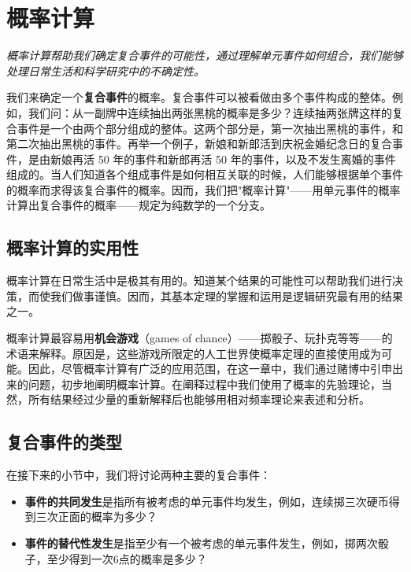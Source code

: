 \section{概率计算}

\begin{logicbox}[title=引言]
\textit{概率计算帮助我们确定复合事件的可能性，通过理解单元事件如何组合，我们能够处理日常生活和科学研究中的不确定性。}
\end{logicbox}

我们来确定一个\textbf{复合事件}的概率。复合事件可以被看做由多个事件构成的整体。例如，我们问：从一副牌中连续抽出两张黑桃的概率是多少？连续抽两张牌这样的复合事件是一个由两个部分组成的整体。这两个部分是，第一次抽出黑桃的事件，和第二次抽出黑桃的事件。再举一个例子，新娘和新郎活到庆祝金婚纪念日的复合事件，是由新娘再活 50 年的事件和新郎再活 50 年的事件，以及不发生离婚的事件组成的。当人们知道各个组成事件是如何相互关联的时候，人们能够根据单个事件的概率而求得该复合事件的概率。因而，我们把"概率计算"——用单元事件的概率计算出复合事件的概率——规定为纯数学的一个分支。

\subsection{概率计算的实用性}

概率计算在日常生活中是极其有用的。知道某个结果的可能性可以帮助我们进行决策，而使我们做事谨慎。因而，其基本定理的掌握和运用是逻辑研究最有用的结果之一。

概率计算最容易用\textbf{机会游戏}（games of chance）——掷骰子、玩扑克等等——的术语来解释。原因是，这些游戏所限定的人工世界使概率定理的直接使用成为可能。因此，尽管概率计算有广泛的应用范围，在这一章中，我们通过赌博中引申出来的问题，初步地阐明概率计算。在阐释过程中我们使用了概率的先验理论，当然，所有结果经过少量的重新解释后也能够用相对频率理论来表述和分析。

\subsection{复合事件的类型}

在接下来的小节中，我们将讨论两种主要的复合事件：
\begin{itemize}
\item \textbf{事件的共同发生}是指所有被考虑的单元事件均发生，例如，连续掷三次硬币得到三次正面的概率为多少？
\item \textbf{事件的替代性发生}是指至少有一个被考虑的单元事件发生，例如，掷两次骰子，至少得到一次6点的概率是多少？
\end{itemize}

